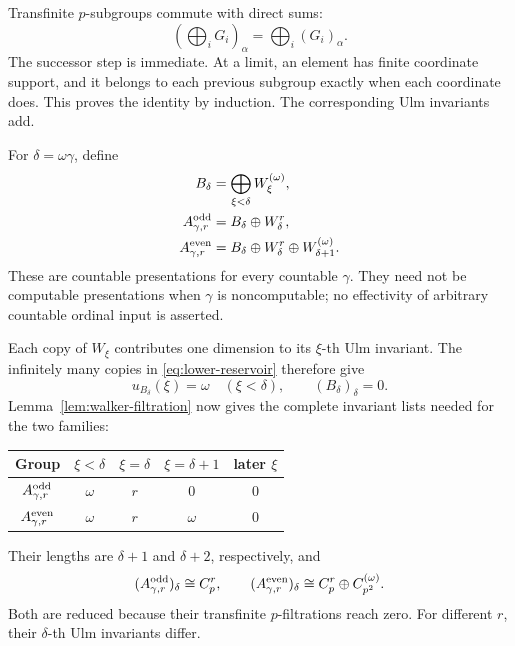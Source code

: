 \documentclass[11pt]{article}
\begin{document}
Transfinite $p$-subgroups commute with direct sums:
\begin{equation}\label{eq:p-filtration-direct-sums}
 \left(\bigoplus_i G_i\right)_\alpha
 =\bigoplus_i(G_i)_\alpha.
\end{equation}
The successor step is immediate. At a limit, an element has finite
coordinate support, and it belongs to each previous subgroup exactly
when each coordinate does. This proves the identity by induction.
The corresponding Ulm invariants add.

For $\delta=\omega\gamma$, define
\begin{align}
 B_\delta&=\bigoplus_{\xi<\delta}W_\xi^{(\omega)},
 \label{eq:lower-reservoir}\\
 A^{\rm odd}_{\gamma,r}
 &=B_\delta\oplus W_\delta^r,
 \label{eq:odd-group}\\
 A^{\rm even}_{\gamma,r}
 &=B_\delta\oplus W_\delta^r
                 \oplus W_{\delta+1}^{(\omega)}.
 \label{eq:even-group}
\end{align}
These are countable presentations for every countable $\gamma$.
They need not be computable presentations when $\gamma$ is
noncomputable; no effectivity of arbitrary countable ordinal input is
asserted.

Each copy of $W_\xi$ contributes one dimension to its $\xi$-th Ulm
invariant. The infinitely many copies in \eqref{eq:lower-reservoir}
therefore give
\[
 u_{B_\delta}(\xi)=\omega\quad(\xi<\delta),
 \qquad (B_\delta)_\delta=0.
\]
Lemma~\ref{lem:walker-filtration} now gives the complete invariant
lists needed for the two families:
\begin{center}
\begin{tabular}{c|c|c|c|c}
Group & $\xi<\delta$ & $\xi=\delta$ & $\xi=\delta+1$ & later $\xi$\\
\hline
$A^{\rm odd}_{\gamma,r}$ & $\omega$ & $r$ & $0$ & $0$\\
$A^{\rm even}_{\gamma,r}$ & $\omega$ & $r$ & $\omega$ & $0$
\end{tabular}
\end{center}
Their lengths are $\delta+1$ and $\delta+2$, respectively, and
\begin{equation}\label{eq:terminal-groups}
 (A^{\rm odd}_{\gamma,r})_\delta\cong C_p^r,
 \qquad
 (A^{\rm even}_{\gamma,r})_\delta
 \cong C_p^r\oplus C_{p^2}^{(\omega)}.
\end{equation}
Both are reduced because their transfinite $p$-filtrations reach zero.
For different $r$, their $\delta$-th Ulm invariants differ.
\end{document}

